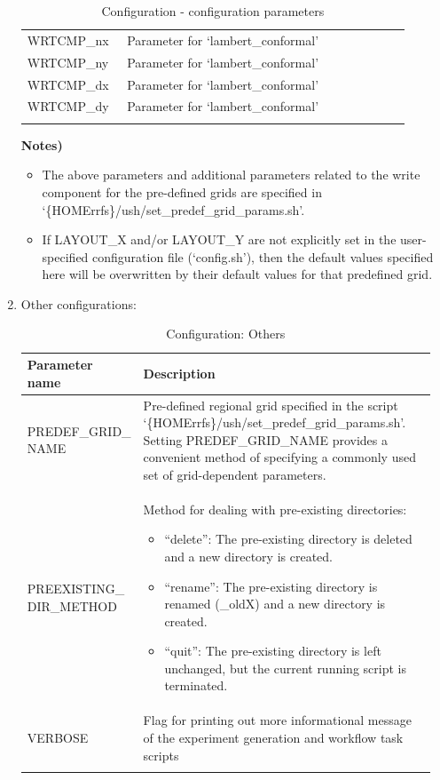\documentclass[11pt,fleqn]{report}              %
\begin{document}
\begin{enumerate}
{\begin{longtable}{p{0.21\linewidth} | p{0.69\linewidth} }
WRTCMP\_nx & Parameter for `lambert\_conformal' \\
WRTCMP\_ny & Parameter for `lambert\_conformal' \\
WRTCMP\_dx & Parameter for `lambert\_conformal' \\
WRTCMP\_dy & Parameter for `lambert\_conformal' \\
\hline
\caption{Configuration - configuration parameters }
\label{table:config_configparam}
\end{longtable}
}
{\bf Notes)}
\begin{itemize} 
\item The above parameters and additional parameters related to the write component for the pre-defined grids are specified in `\{HOMErrfs\}/ush/set\_predef\_grid\_params.sh'.
\item If LAYOUT\_X and/or LAYOUT\_Y are not explicitly set in the user-specified configuration file (`config.sh'), then the default values specified here will be overwritten by their default values for that predefined grid. 
\end{itemize}

\vspace{0.3cm}

\item Other configurations:
{
\scriptsize
\begin{longtable}{p{0.14\linewidth} | p{0.82\linewidth} }
\hline
\hline
Parameter name & Description \\
\hline
PREDEF\_GRID\_ NAME & Pre-defined regional grid specified in the script `\{HOMErrfs\}/ush/set\_predef\_grid\_params.sh'. Setting PREDEF\_GRID\_NAME provides a convenient method of specifying a commonly used set of grid-dependent parameters.  \\
PREEXISTING\_ DIR\_METHOD & Method for dealing with pre-existing directories: \begin{itemize} \item ``delete'': The pre-existing directory is deleted and a new directory is created.  \item ``rename'': The pre-existing directory is renamed (\_oldX) and a new directory is created. \item ``quit'': The pre-existing directory is left unchanged, but the current running script is terminated. \end{itemize} \\
VERBOSE & Flag for printing out more informational message of the experiment generation and workflow task scripts \\
\hline
\caption{Configuration: Others}
\label{table:config_others}
\end{longtable}
}


\end{enumerate}
\end{document}
